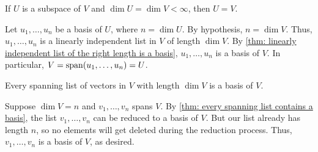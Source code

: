 \begin{thm} 
  \label{thm: subspace of full dimension equals the whole space}
  If $U$ is a subspace of $V$ and $\dim U = \dim V < \infty$, then $U=V$.
\end{thm}
\begin{prf}
  Let $u_1, \ldots, u_n$ be a basis of $U$, where $n = \dim U$. By hypothesis, $n = \dim V$.
  Thus, $u_1, \ldots, u_n$ is a linearly independent list in $V$ of length $\dim V$.
  By \ref{thm: linearly independent list of the right length is a basis}, $u_1, \ldots, u_n$ is a basis of $V$.
  In particular, $V = \operatorname{span} (u_1, \ldots, u_n) = U$.
\end{prf}

\setcounter{thm}{41}
\begin{thm} 
  \label{thm: spanning list of the right length}
  Every spanning list of vectors in $V$ with length $\dim V$ is a basis of $V$.
\end{thm}
\begin{prf}
  Suppose $\dim V = n$ and $v_1, \ldots, v_n$ spans $V$.
  By \ref{thm: every spanning list contains a basis}, the list $v_1, \ldots, v_n$ can be reduced to a basis of $V$.
  But our list already has length $n$, so no elements will get deleted during the reduction process.
  Thus, $v_1, \ldots, v_n$ is a basis of $V$, as desired.
\end{prf}

